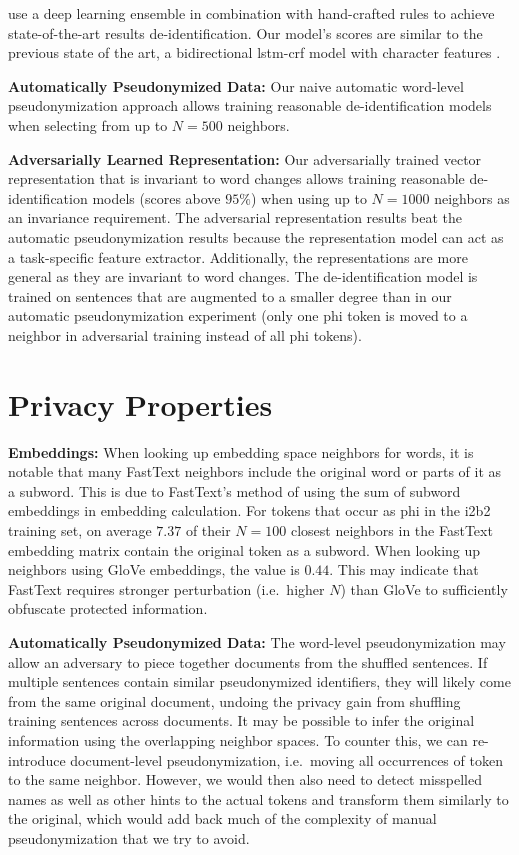 %
\citet{liu2017identification} use a deep learning ensemble in combination with hand-crafted rules to achieve state-of-the-art results de-identification.
%
Our model's scores are similar to the previous state of the art, a bidirectional \ac{lstm}-\ac{crf} model with character features \citep{dernoncourt2017identification}.

\textbf{Automatically Pseudonymized Data:}
%
Our naive automatic word-level pseudonymization approach allows training reasonable de-identification models when selecting from up to $N=500$ neighbors.
%

\textbf{Adversarially Learned Representation:}
%
Our adversarially trained vector representation that is invariant to word changes allows training reasonable de-identification models (\fone scores above $95\%$) when using up to $N=1000$ neighbors as an invariance requirement.
%
The adversarial representation results beat the automatic pseudonymization results because the representation model can act as a task-specific feature extractor.
%
Additionally, the representations are more general as they are invariant to word changes.
%
The de-identification model is trained on sentences that are augmented to a smaller degree than in our automatic pseudonymization experiment (only one \ac{phi} token is moved to a neighbor in adversarial training instead of all \ac{phi} tokens).

\section{Privacy Properties}

\textbf{Embeddings:}
%
When looking up embedding space neighbors for words, it is notable that many FastText neighbors include the original word or parts of it as a subword.
%
This is due to FastText's method of using the sum of subword embeddings in embedding calculation.
%
For tokens that occur as \ac{phi} in the i2b2 training set, on average $7.37$ of their $N=100$ closest neighbors in the FastText embedding matrix contain the original token as a subword.
%
When looking up neighbors using GloVe embeddings, the value is $0.44$.
%
This may indicate that FastText requires stronger perturbation (i.e.\ higher $N$) than GloVe to sufficiently obfuscate protected information.

\textbf{Automatically Pseudonymized Data:}
%
The word-level pseudonymization may allow an adversary to piece together documents from the shuffled sentences.
%
If multiple sentences contain similar pseudonymized identifiers, they will likely come from the same original document, undoing the privacy gain from shuffling training sentences across documents.
%
It may be possible to infer the original information using the overlapping neighbor spaces.
%
To counter this, we can re-introduce document-level pseudonymization, i.e.\ moving all occurrences of  token to the same neighbor.
%
However, we would then also need to detect misspelled names as well as other hints to the actual tokens and transform them similarly to the original, which would add back much of the complexity of manual pseudonymization that we try to avoid.

